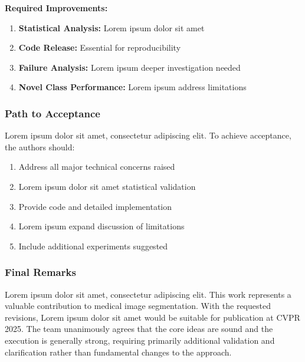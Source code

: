 \textbf{Required Improvements:}
\begin{enumerate}
    \item \textbf{Statistical Analysis:} Lorem ipsum dolor sit amet
    \item \textbf{Code Release:} Essential for reproducibility
    \item \textbf{Failure Analysis:} Lorem ipsum deeper investigation needed
    \item \textbf{Novel Class Performance:} Lorem ipsum address limitations
\end{enumerate}

\subsubsection{Path to Acceptance}
Lorem ipsum dolor sit amet, consectetur adipiscing elit. To achieve acceptance, the authors should:
\begin{enumerate}
    \item Address all major technical concerns raised
    \item Lorem ipsum dolor sit amet statistical validation
    \item Provide code and detailed implementation
    \item Lorem ipsum expand discussion of limitations
    \item Include additional experiments suggested
\end{enumerate}

\subsubsection{Final Remarks}
Lorem ipsum dolor sit amet, consectetur adipiscing elit. This work represents a valuable contribution to medical image segmentation. With the requested revisions, Lorem ipsum dolor sit amet would be suitable for publication at CVPR 2025. The team unanimously agrees that the core ideas are sound and the execution is generally strong, requiring primarily additional validation and clarification rather than fundamental changes to the approach.